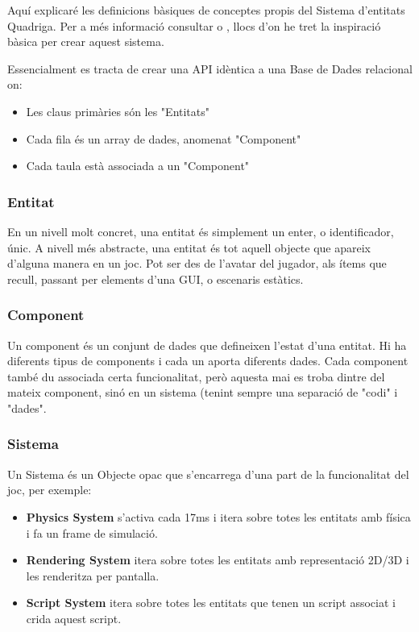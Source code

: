 Aquí explicaré les definicions bàsiques de conceptes propis del Sistema d'entitats Quadriga. Per a més informació consultar \cite{EntityWikiB} o \cite{Martin07}, llocs d'on he tret la inspiració bàsica per crear aquest sistema.

Essencialment es tracta de crear una API idèntica a una Base de Dades relacional on:

\begin{itemize}
  \item Les claus primàries són les "Entitats"
  \item Cada fila és un array de dades, anomenat "Component"
  \item Cada taula està associada a un "Component"
\end{itemize}

\subsubsection{Entitat}

En un nivell molt concret, una entitat és simplement un enter, o identificador, únic. A nivell més abstracte, una entitat és tot aquell objecte que apareix d'alguna manera en un joc. Pot ser des de l'avatar del jugador, als ítems que recull, passant per elements d'una GUI, o escenaris estàtics.

\subsubsection{Component}

Un component és un conjunt de dades que defineixen l'estat d'una entitat. Hi ha diferents tipus de components i cada un aporta diferents dades. Cada component també du associada certa funcionalitat, però aquesta mai es troba dintre del mateix component, sinó en un sistema (tenint sempre una separació de "codi" i "dades".

\subsubsection{Sistema}

Un Sistema és un Objecte opac que s'encarrega d'una part de la funcionalitat del joc, per exemple:
\begin{itemize}
  \item{\bf Physics System} s'activa cada 17ms i itera sobre totes les entitats amb física i fa un frame de simulació.
  \item{\bf Rendering System} itera sobre totes les entitats amb representació 2D/3D i les renderitza per pantalla.
  \item{\bf Script System} itera sobre totes les entitats que tenen un script associat i crida aquest script.
\end{itemize}

